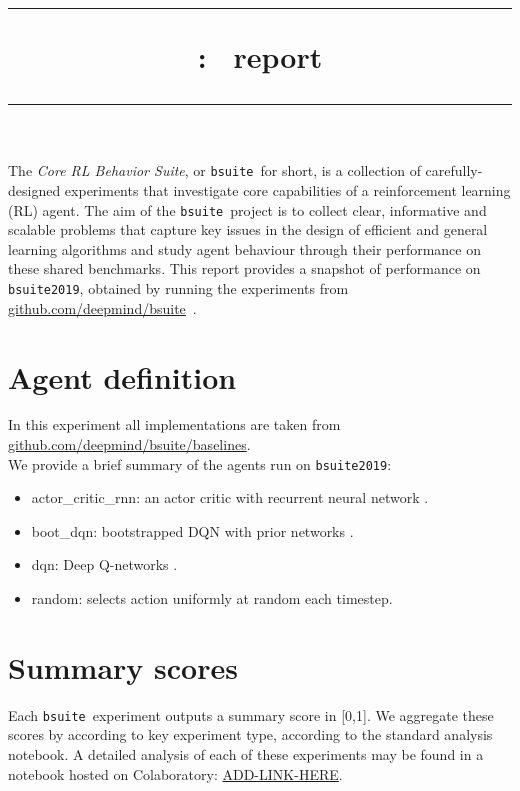 \documentclass[11pt]{article}
\title{
\vspace{-20mm}
\rule{\linewidth}{4pt}
\vskip 1mm
\fullname: \shortname\ report
\vskip -6mm
\rule{\linewidth}{1pt}
\vskip -20mm
}
\date{}
\author{}
\newcommand{\fullname}{Core RL Behavior Suite}
\newcommand{\shortname}{\texttt{bsuite}}
\newcommand{\github}{\url{github.com/deepmind/bsuite}}
\newcommand{\version}{\texttt{bsuite2019}}
\newcommand{\fullreport}{\url{ADD-LINK-HERE}}
\begin{document}
\maketitle


{\small
\begin{adjustwidth}{1.5cm}{1.5cm}
The \textit{\fullname}, or \shortname\ for short, is a collection of carefully-designed experiments that investigate core capabilities of a reinforcement learning (RL) agent.
The aim of the \shortname\ project is to collect clear, informative and scalable problems that capture key issues in the design of efficient and general learning algorithms and study agent behaviour through their performance on these shared benchmarks.
This report provides a snapshot of performance on \version, obtained by running the experiments from \github\ \cite{osband2019bsuite}.
\end{adjustwidth}
}

\section{Agent definition}
In this experiment all implementations are taken from \url{github.com/deepmind/bsuite/baselines}. \\
We provide a brief summary of the agents run on \version:
\vspace{-2mm}
\begin{itemize}[noitemsep, nolistsep]
    \item actor\_critic\_rnn: an actor critic with recurrent neural network \cite{gittins1979bandit}.
    \item boot\_dqn: bootstrapped DQN with prior networks \cite{osband2016deep,osband2018rpf}.
    \item dqn: Deep Q-networks \cite{mnih2015human}.
    \item random: selects action uniformly at random each timestep.
\end{itemize}



\section{Summary scores}

Each \shortname\ experiment outputs a summary score in [0,1].
We aggregate these scores by according to key experiment type, according to the standard analysis notebook.
A detailed analysis of each of these experiments may be found in a notebook hosted on Colaboratory: \fullreport.
\end{document}
